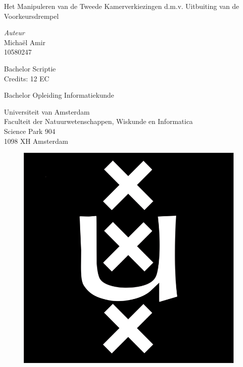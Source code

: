 

\begin{center}

\vspace{2.5cm}

\begin{Huge}
Het Manipuleren van de Tweede Kamerverkiezingen d.m.v. Uitbuiting van de Voorkeursdrempel
\end{Huge}

\vspace{1.5cm}

\emph{Auteur}\\
Micha\"{e}l Amir\\
10580247

\vspace{0.5cm}

Bachelor Scriptie\\
Credits: 12 EC

\vspace{0.5cm}

Bachelor Opleiding Informatiekunde

\vspace{0.25cm}

Universiteit van Amsterdam\\
Faculteit der Natuurwetenschappen, Wiskunde en Informatica\\
Science Park 904\\
1098 XH Amsterdam

\vspace{1cm}
\begin{figure}[H]
\centering

	\includegraphics[width=0.1\linewidth]{UVA.png}


\end{figure}
\end{center}
